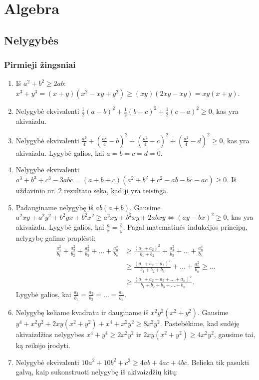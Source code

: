\section*{Algebra}
\subsection*{Nelygybės}
\subsubsection*{Pirmieji žingsniai}
\begin{enumerate} 
\item 
Iš $a^2+b^2\geq2ab$:
$x^3+y^3=(x+y)(x^2-xy+y^2)\geq(xy)(2xy-xy)=xy(x+y)$.
\item 
Nelygybė ekvivalenti
$\frac{1}{2}(a-b)^2+\frac{1}{2}(b-c)^2+\frac{1}{2}(c-a)^2\geq 0$, kas
yra akivaizdu.
\item 
Nelygybė ekvivalenti
$\frac{a^2}{4}+\left(\frac{a^2}{4}-b\right)^2+\left(\frac{a^2}{4}-c\right)^2+\left(\frac{a^2}{4}-d\right)^2\geq0$,
kas yra akivaizdu. Lygybė galios, kai $a=b=c=d=0$.
\item 
Nelygybė ekvivalenti
$a^3+b^3+c^3-3abc=(a+b+c)(a^2+b^2+c^2-ab-bc-ac)\geq0.$ Iš uždavinio
nr. 2 rezultato seka, kad ji yra teisinga.
\item 
Padauginame nelygybę iš $ab(a+b)$. Gausime
$a^2xy+a^2y^2+b^2yx+b^2x^2\geq a^2xy+b^2xy+2abxy \Leftrightarrow
(ay-bx)^2\geq0$, kas yra akivaizdu. Lygybė galios, kai
$\frac{a}{x}=\frac{b}{y}$. Pagal matematinės indukcijos principą,
nelygybę galime praplėsti:\begin{align*}
\frac{a_1^2}{b_1}+\frac{a_2^2}{b_2}+\frac{a_3^2}{b_3}+...+\frac{a_n^2}{b_n}&\geq
\frac{(a_1+a_2)^2}{b_1+b_2}+\frac{a_3^2}{b_3}+...+\frac{a_n^2}{b_n}\\
&\geq\frac{(a_1+a_2+a_3)^2}{b_1+b_2+b_3}+...+\frac{a_n^2}{b_n}\geq...\\
&\geq\frac{(a_1+a_2+a_3+...+a_n)^2}{b_1+b_2+b_3+...+b_n}.\end{align*}
Lygybė galios, kai
$\frac{a_1}{b_1}=\frac{a_2}{b_2}=...=\frac{a_n}{b_n}.$
\item 
Nelygybę keliame kvadratu ir dauginame iš $x^2y^2(x^2+y^2)$. Gausime
$y^4+x^2y^2+2xy(x^2+y^2)+x^4+x^2y^2\geq 8x^2y^2.$ Pastebėkime, kad
sudėję akivaizdžias nelygybes $x^4+y^4\geq2x^2y^2$ ir
$2xy(x^2+y^2)\geq4x^2y^2$, gausime tai, ką reikėjo įrodyti.
\item 
Nelygybė ekvivalenti $10a^2+10b^2+c^2\geq4ab+4ac+4bc.$ Belieka tik
pasukti galvą, kaip sukonstruoti nelygybę iš akivaizdžių kitų:

\end{enumerate}
